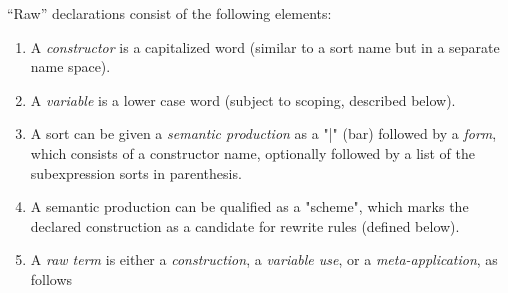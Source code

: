 \documentclass[11pt]{article} %
\begin{document}
\begin{manual}\label{man:raw}
  ``Raw'' declarations consist of the following elements:
  \begin{enumerate}

  \item A \emph{constructor} is a capitalized word (similar to a sort name but in a separate name
    space).

  \item A \emph{variable} is a lower case word (subject to scoping, described below).

  \item A sort can be given a \emph{semantic production} as a "|" (bar) followed by a \emph{form},
    which consists of a constructor name, optionally followed by a list of the subexpression sorts
    in parenthesis.


  \item A semantic production can be qualified as a "scheme", which marks the declared construction
    as a candidate for rewrite rules (defined below).

  \item A \emph{raw term} is either a \emph{construction}, a \emph{variable use}, or a
    \emph{meta-application}, as follows
    \begin{enumerate}


\end{enumerate}
\end{enumerate}
\end{manual}
\end{document}
